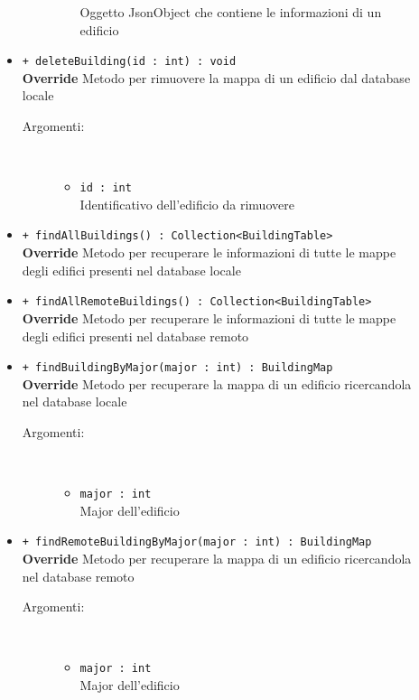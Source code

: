 \documentclass[../DefinizioneDiProdotto.tex]{subfiles}
\begin{document}
\begin{description}
\begin{itemize}
\begin{description}
\begin{itemize}
Oggetto JsonObject che contiene le informazioni di un edificio\end{itemize}
\end{description}
\item \texttt{+ deleteBuilding(id : int) : void}\\
\textbf{Override} Metodo per rimuovere la mappa di un edificio dal database locale
 \begin{description}
\item[Argomenti:] \
\begin{itemize}
\item \texttt{id : int}\\
Identificativo dell'edificio da rimuovere\end{itemize}
\end{description}
\item \texttt{+ findAllBuildings() : Collection<BuildingTable>}\\
\textbf{Override} Metodo per recuperare le informazioni di tutte le mappe degli edifici presenti nel database locale
 \item \texttt{+ findAllRemoteBuildings() : Collection<BuildingTable>}\\
\textbf{Override} Metodo per recuperare le informazioni di tutte le mappe degli edifici presenti nel database remoto
 \item \texttt{+ findBuildingByMajor(major : int) : BuildingMap}\\
\textbf{Override} Metodo per recuperare la mappa di un edificio ricercandola nel database locale
 \begin{description}
\item[Argomenti:] \
\begin{itemize}
\item \texttt{major : int}\\
Major dell'edificio\end{itemize}
\end{description}
\item \texttt{+ findRemoteBuildingByMajor(major : int) : BuildingMap}\\
\textbf{Override} Metodo per recuperare la mappa di un edificio ricercandola nel database remoto
 \begin{description}
\item[Argomenti:] \
\begin{itemize}
\item \texttt{major : int}\\
Major dell'edificio\end{itemize}

\end{description}
\end{itemize}
\end{description}
\end{document}
